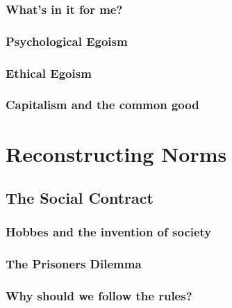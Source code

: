 \documentclass[]{book}
\begin{document}
\hypertarget{whats-in-it-for-me}{%
\section{What's in it for me?}\label{whats-in-it-for-me}}

\hypertarget{psychological-egoism}{%
\section{Psychological Egoism}\label{psychological-egoism}}

\hypertarget{ethical-egoism}{%
\section{Ethical Egoism}\label{ethical-egoism}}

\hypertarget{capitalism-and-the-common-good}{%
\section{Capitalism and the common good}\label{capitalism-and-the-common-good}}

\hypertarget{part-reconstructing-norms}{%
\part*{Reconstructing Norms}\label{part-reconstructing-norms}}


\hypertarget{the-social-contract}{%
\chapter{The Social Contract}\label{the-social-contract}}

\hypertarget{hobbes-and-the-invention-of-society}{%
\section{Hobbes and the invention of society}\label{hobbes-and-the-invention-of-society}}

\hypertarget{the-prisoners-dilemma}{%
\section{The Prisoners Dilemma}\label{the-prisoners-dilemma}}

\hypertarget{why-should-we-follow-the-rules}{%
\section{Why should we follow the rules?}\label{why-should-we-follow-the-rules}}
\end{document}
